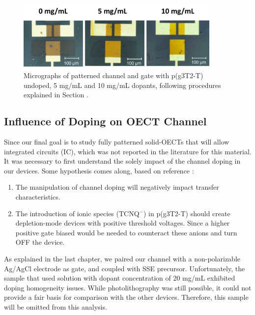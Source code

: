 \begin{figure}[ht]
  \centering
  \includegraphics[width=10cm]{Images/pdf/BigGateDevices.pdf}
  \caption[Micrographs of a patterned channel and gate p(g3T2-T) at different doping levels]{Micrographs of patterned channel and gate with p(g3T2-T) undoped, 5 mg/mL and 10 mg/mL dopants, following procedures explained in Section \label{subsec:photo}.}
  \label{fig:channel}
\end{figure}


\subsection{Influence of Doping on OECT Channel}
Since our final goal is to study fully patterned solid-OECTs that will allow integrated circuits (IC), which was not reported in the literature for this material. It was necessary to first understand the solely impact of the channel doping in our devices. Some hypothesis comes along, based on reference \cite{tanTuningOrganicElectrochemical2022}:

\begin{enumerate}
\item The manipulation of channel doping will negatively impact transfer characteristics.
\item The introduction of ionic species (TCNQ$^{-}$) in p(g3T2-T) should create depletion-mode devices with positive threshold voltages. Since a higher positive gate biased would be needed to counteract these anions and turn OFF the device.
\end{enumerate}

As explained in the last chapter, we paired our channel with a non-polarizable Ag/AgCl electrode as gate, and coupled with SSE precursor. Unfortunately, the sample that used solution with dopant concentration of 20 mg/mL exhibited doping homogeneity issues. While photolithography was still possible, it could not provide a fair basis for comparison with the other devices. Therefore, this sample will be omitted from this analysis.

